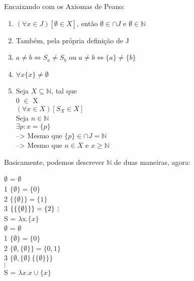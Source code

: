 \documentclass[12pt, a4paper]{article}
\begin{document}
			Encaixando com os Axiomas de Peano:
			\begin{enumerate}
			\item $(\forall x \in J)[\emptyset \in X]$, ent\~ao $\emptyset \in \cap J$ e $\emptyset \in \mathbb{N}$
			\item Tamb\'em, pela pr\'opria defini\c{c}\~ao de J
			\item $a \neq b \Leftrightarrow S_a \neq S_b$ ou $a \neq b \Leftrightarrow \{a\} \neq \{b\}$
			\item $\forall x \{x\} \neq \emptyset$
			\item Seja $X \subseteq \mathbb{N}$, tal que\\	
					0 $\in$ X\\
					$(\forall x \in X)[S_X \in X]$\\
					Seja $n \in \mathbb{N}$\\
					$\exists p : x = \{p\}$\\
					--> Mesmo que $\{p\} \in \cap J = \mathbb{N}$\\
					--> Mesmo que $n \in X$ e $x \geq \mathbb{N}$
			\end{enumerate}

			Basicamente, podemos descrever $\mathbb{N}$ de duas maneiras, agora:
			\begin{multicols}{2}
				 \hspace{4bp} $\emptyset$ = $\emptyset$\\
				1 \hspace{4bp} $\{\emptyset\} = \{0\}$\\
				2 \hspace{4bp} $\{\{\emptyset\}\} = \{1\}$\\
				3 \hspace{4bp} $\{\{\{\emptyset\}\}\} = \{2\}\\$
				$\vdots$\\
				\hspace{5bp} S = $\lambda$x.$\{x\}$ \\

				 \hspace{4bp} $\emptyset$ = $\emptyset$\\
				1 \hspace{4bp} $\{\emptyset\} = \{0\}$\\
				2 \hspace{4bp} $\{\emptyset, \{\emptyset\}\} = \{0,1\}$\\
				3 \hspace{4bp} $\{\emptyset, \{\emptyset\}\, \{\{\emptyset\}\}\}$\\
				$\vdots$\\
				\hspace{5bp} S = $\lambda x.x \cup \{x\} $
			\end{multicols}
			
\end{document}
